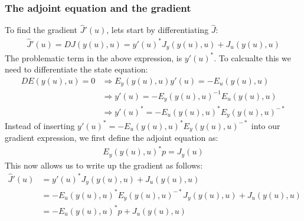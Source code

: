 \documentclass[11pt,a4paper]{article}
\begin{document}
\subsubsection{The adjoint equation and the gradient}
To find the gradient $\hat{J}'(u)$, lets start by differentiating $\hat J$:
\begin{align*}
\hat{J}'(u) = DJ(y(u),u) = y'(u)^*J_y(y(u),u) + J_u(y(u),u)
\end{align*}
The problematic term in the above expression, is $y'(u)^*$. To calcualte this we need to differentiate the state equation:
\begin{align*}
DE(y(u),u)=0 &\Rightarrow E_y(y(u),u)y'(u)=-E_u(y(u),u) \\ &\Rightarrow y'(u)=-E_y(y(u),u)^{-1}E_u(y(u),u) \\ &\Rightarrow y'(u)^* = -E_u(y(u),u)^*E_y(y(u),u)^{-*}
\end{align*}
Instead of inserting $y'(u)^* = -E_u(y(u),u)^*E_y(y(u),u)^{-*}$ into our gradient expression, we first define the adjoint equation as:
\begin{align}
E_y(y(u),u)^{*}p=J_y(u) \label{general adjoint}
\end{align}
This now allows us to write up the gradient as follows:
\begin{align}
\hat{J}'(u)&= y'(u)^*J_y(y(u),u) + J_u(y(u),u)\\
&=-E_u(y(u),u)^*E_y(y(u),u)^{-*}J_y(y(u),u) + J_u(y(u),u) \\
&= -E_u(y(u),u)^*p +J_u(y(u),u) \label{gradient}
\end{align}
\end{document}
